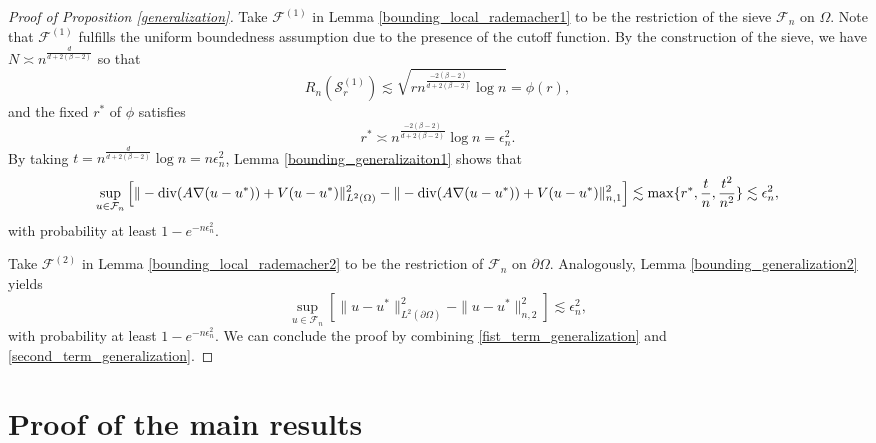 \documentclass{article}
\newcommand{\F}{\mathcal{F}}
\renewcommand{\div}{\textnormal{div}}
\theoremstyle{plain}
\theoremstyle{definition}
\theoremstyle{remark}
\begin{document}
\begin{proof}[Proof of Proposition \ref{generalization}]
    Take $\F^{(1)}$ in Lemma \ref{bounding_local_rademacher1} to be the restriction of the sieve $\F_n$ on $\Omega$. Note that $\F^{(1)}$ fulfills the uniform boundedness assumption due to the presence of the cutoff function. 
    By the construction of the sieve, we have $N \asymp n^{\frac{d}{d + 2(\beta-2)}}$ so that 
    \begin{equation*}
        R_n(\mathcal{S}_r^{(1)}) \lesssim \sqrt{r n^{\frac{-2(\beta-2)}{d + 2(\beta-2)}} \log n} = \phi(r), 
    \end{equation*}
    and the fixed $r^*$ of $\phi$ satisfies
    \begin{equation*}
        r^* \asymp n^{\frac{-2(\beta-2)}{d + 2(\beta-2)}} \log n = \epsilon_n^2. 
    \end{equation*}
    By taking $t = n^{\frac{d}{d + 2(\beta-2)}} \log n = n \epsilon_n^2$, Lemma \ref{bounding_generalizaiton1} shows that 
    \begin{equation} \label{fist_term_generalization}
        \begin{aligned}
        \sup_{u \in \F_n} \left[ \|-\div(A \nabla (u-u^*)) + V(u-u^*) \|_{L^2(\Omega)}^2 - \|-\div(A \nabla (u-u^*)) + V(u-u^*) \|_{n, 1}^2  \right]  \lesssim   \max\{r^*, \frac{t}{n}, \frac{t^2}{n^2}\} 
        \lesssim \epsilon_n^2,
    \end{aligned}
    \end{equation}
    with probability at least $1 - e^{-n\epsilon_n^2}$. 
    
    Take $\F^{(2)}$ in Lemma \ref{bounding_local_rademacher2} to be the restriction of $\F_n$ on $\partial \Omega$. Analogously, Lemma \ref{bounding_generalization2} yields \begin{equation}\label{second_term_generalization}
        \sup_{u \in \F_n} \left[\|u - u^*\|_{L^2(\partial \Omega)}^2 - \|u - u^*\|_{n, 2}^2  \right] \lesssim \epsilon_n^2,
    \end{equation}
    with probability at least $1 - e^{-n\epsilon_n^2}$. We can conclude the proof by combining \eqref{fist_term_generalization} and \eqref{second_term_generalization}.
\end{proof}

\section{Proof of the main results}
\end{document}

